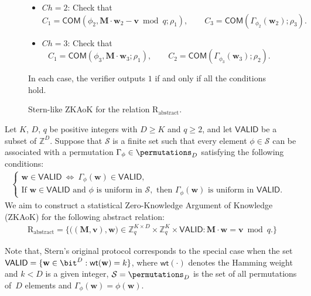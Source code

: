 \begin{figure}[t]
\begin{itemize}
    \item $Ch = 2$: Check that
      \[
        C_1 = \mathsf{COM}(\phi_2, \mathbf{M}\cdot \mathbf{w}_2 - \mathbf{v} \bmod q; \rho_1),\qquad
        {C}_3 = \mathsf{COM}(\Gamma_{\phi_2}(\mathbf{w}_2); \rho_3).
      \]

    \item $Ch = 3$: Check that
      \[
        C_1 =  \mathsf{COM}(\phi_3, \mathbf{M}\cdot \mathbf{w}_3; \rho_1), \qquad
        C_2 =  \mathsf{COM}(\Gamma_{\phi_3}(\mathbf{w}_3); \rho_2).
      \]

  \end{itemize}
  In each case, the verifier outputs $1$ if and only if all the conditions hold.
  \caption{Stern-like \textsf{ZKAoK} for the relation $\mathrm{R_{abstract}}$.}
  \label{fig:Interactive-Protocol}
\end{figure}


Let $K$, $D$, $q$ be positive integers with $D \geq K$ and $q \geq 2$, and let $\mathsf{VALID}$ be a subset of $\mathbb{Z}^D$. Suppose that $\mathcal{S}$ is a finite set such that every element $\phi \in \mathcal{S}$ can be associated with a permutation $\Gamma_\phi \in \permutations_D$ satisfying the following conditions:
\begin{eqnarray}\label{eq:zk-equivalence}
\begin{cases}
\mathbf{w} \in \mathsf{VALID} ~ \iff ~ \Gamma_\phi(\mathbf{w}) \in \mathsf{VALID}, \\
\text{If } \mathbf{w} \in \mathsf{VALID} \text{ and } \phi \text{ is uniform in } \mathcal{S}, \text{ then }  \Gamma_\phi(\mathbf{w}) \text{ is uniform in } \mathsf{VALID}. \quad
\end{cases}
\end{eqnarray}
We aim to construct a statistical Zero-Knowledge Argument of Knowledge (\textsf{ZKAoK}) for the following abstract relation:
\begin{eqnarray*}
\mathrm{R_{abstract}} = \big\{ \big((\mathbf{M}, \mathbf{v}), \mathbf{w} \big) \in \mathbb{Z}_q^{K \times D} \times \mathbb{Z}_q^K \times \mathsf{VALID}: \mathbf{M}\cdot \mathbf{w} = \mathbf{v} \bmod q.\big\}
\end{eqnarray*}

Note that, Stern's original protocol corresponds to the special case when the set
$\mathsf{VALID} = \{
\mathbf{w} \in \bit^D: \mathsf{wt}(\mathbf{w}) = k\}$, where $\mathsf{wt}(\cdot)$ denotes the Hamming weight and $k < D$ is a given integer, $\mathcal{S} = \permutations_D$ is  the set of all permutations of~$D$ elements and $\Gamma_{\phi}(\mathbf{w}) = \phi(\mathbf{w})$.

